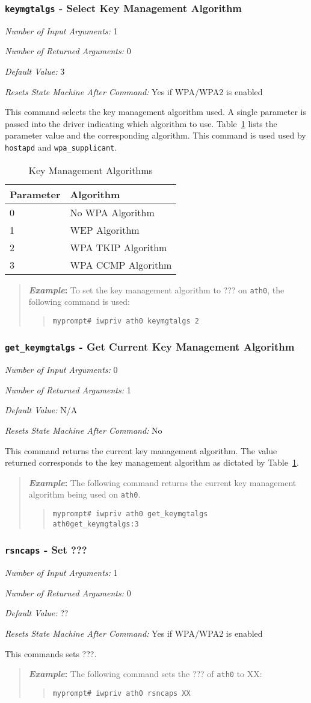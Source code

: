 \documentclass[10pt,fullpage]{article}
\newcommand{\mytt}[1]{{\texttt{#1}}}
\newcommand{\bv}{\begin{verse}}
\newcommand{\ev}{\end{verse}}
\newcommand{\cmd}[1]{{\texttt{myprompt\# #1}}}
\newcommand{\argdesc}[4]{\begin{description}
\itemsep -6pt
\item \textit{Number of Input Arguments:} #1
\item \textit{Number of Returned Arguments:} #2
\item \textit{Default Value:} #3
\item \textit{Resets State Machine After Command:} #4
\end{description}
}
\newenvironment{example}{\begin{quote}\textbf{\textit{Example}:}}{\end{quote}}
\begin{document}
\subsubsection{\mytt{keymgtalgs} - Select Key Management Algorithm}
\argdesc{1}{0}{3}{Yes if WPA/WPA2 is enabled}
This command selects the key management algorithm used.  A single
parameter is passed into the driver indicating which algorithm to use.
Table~\ref{tab:keymgtalgs} lists the parameter value and the
corresponding algorithm.  This command is used used by \mytt{hostapd}
and \mytt{wpa\_supplicant}.
\begin{table}
  \centering
  \begin{tabular}{|l|l|} \hline
    Parameter & Algorithm \\ \hline
    0 & No WPA Algorithm\\
    1 & WEP Algorithm \\
    2 & WPA TKIP Algorithm \\
    3 & WPA CCMP Algorithm \\ \hline
  \end{tabular}
  \caption{Key Management Algorithms}
  \label{tab:keymgtalgs}
\end{table}
\begin{example}
  To set the key management algorithm to ??? on \mytt{ath0}, the
  following command is used:
  \bv
  \cmd{iwpriv ath0 keymgtalgs 2}
  \ev
\end{example}

\subsubsection{\mytt{get\_keymgtalgs} - Get Current Key Management Algorithm}
\argdesc{0}{1}{N/A}{No}
This command returns the current key management algorithm.  The value
returned corresponds to the key management algorithm as dictated by
Table~\ref{tab:keymgtalgs}.
\begin{example}
  The following command returns the current key management algorithm
  being used on \mytt{ath0}.
  \bv
  \cmd{iwpriv ath0 get\_keymgtalgs}\\
  \mytt{ath0\hspace{32pt}get\_keymgtalgs:3}
  \ev
\end{example}

\subsubsection{\mytt{rsncaps} - Set ???}
\argdesc{1}{0}{??}{Yes if WPA/WPA2 is enabled}
This commands sets ???.
\begin{example}
  The following command sets the ??? of \mytt{ath0} to XX:
  \bv
  \cmd{iwpriv ath0 rsncaps XX}
  \ev
\end{example}
\end{document}

